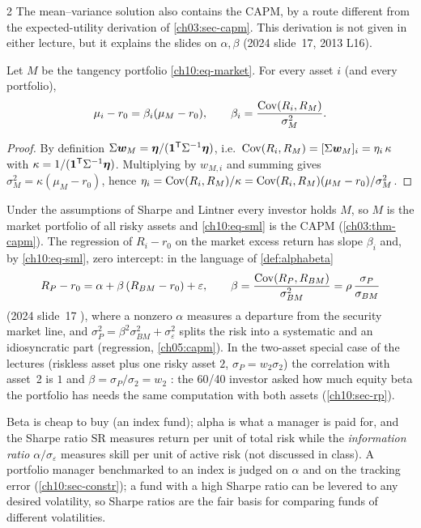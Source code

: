 \begin{paracol}{2}
The mean--variance solution also contains the CAPM, by a route different from the expected-utility derivation of
\cref{ch03:sec-capm}. This derivation is not given in either lecture, but it explains the slides on
$\alpha,\beta$ (2024 slide~17, 2013 L16).
\begin{proposition}\label{ch10:prop-sml}
Let $M$ be the tangency portfolio \eqref{ch10:eq-market}. For every asset $i$ (and every portfolio),
\begin{equation}\label{ch10:eq-sml}
  \mu_i-r_0=\beta_i(\mu_M-r_0),\qquad \beta_i=\frac{\operatorname{Cov}(R_i,R_M)}{\sigma_M^2}.
\end{equation}
\end{proposition}
\begin{proof}
By definition $\Sigma\bm w_M=\bm\eta/(\bm 1^{\mathsf T}\Sigma^{-1}\bm\eta)$, i.e.\ $\operatorname{Cov}(R_i,R_M)=[\Sigma\bm w_M]_i=
\eta_i\,\kappa$ with $\kappa=1/(\bm 1^{\mathsf T}\Sigma^{-1}\bm\eta)$. Multiplying by $w_{M,i}$ and summing gives
$\sigma_M^2=\kappa(\mu_M-r_0)$, hence $\eta_i=\operatorname{Cov}(R_i,R_M)/\kappa=\operatorname{Cov}(R_i,R_M)(\mu_M-r_0)/\sigma_M^2$.
\end{proof}
Under the assumptions of Sharpe and Lintner every investor holds $M$, so $M$ is the market portfolio of all risky
assets and \eqref{ch10:eq-sml} is the CAPM (\cref{ch03:thm-capm}). The regression of $R_i-r_0$ on the market
excess return has slope $\beta_i$ and, by \eqref{ch10:eq-sml}, zero intercept: in the language of \cref{def:alphabeta}
\[
  R_P-r_0=\alpha+\beta\,(R_{BM}-r_0)+\varepsilon,\qquad \beta=\frac{\operatorname{Cov}(R_P,R_{BM})}{\sigma_{BM}^2}=\rho\,\frac{\sigma_P}{\sigma_{BM}}
\]
(2024 slide~17 ), where a nonzero $\alpha$ measures a departure from the security market line, and
$\sigma_P^2=\beta^2\sigma_{BM}^2+\sigma_\varepsilon^2$ splits the risk into a systematic and an idiosyncratic part
(regression, \cref{ch05:capm}). In the two-asset special case of the lectures (riskless asset plus one risky
asset $2$, $\sigma_P=w_2\sigma_2$) the correlation with asset~2 is $1$ and $\beta=\sigma_P/\sigma_2=w_2$
: the 60/40 investor asked how much equity beta the portfolio has needs the
same computation with both assets (\cref{ch10:sec-rp}).

\begin{finance}
Beta is cheap to buy (an index fund); alpha is what a manager is paid for, and the Sharpe ratio $\mathrm{SR}$
measures return per unit of total risk while the \emph{information ratio} $\alpha/\sigma_\varepsilon$ measures
skill per unit of active risk (not discussed in class). A portfolio manager benchmarked to an index is judged on
$\alpha$ and on the tracking error (\cref{ch10:sec-constr}); a fund with a high Sharpe ratio can be levered to
any desired volatility, so Sharpe ratios are the fair basis for comparing funds of different volatilities.
\end{finance}



\end{paracol}
